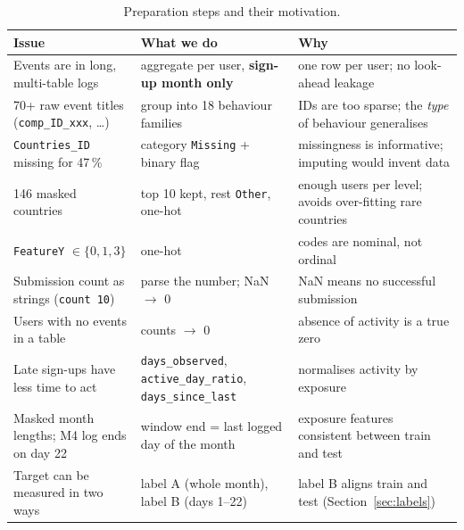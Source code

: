\documentclass[11pt,a4paper]{article}
\newcommand{\code}[1]{\texttt{#1}}
\begin{document}
\begin{table}[H]\centering\small
\begin{tabular}{>{\raggedright}p{4.3cm}>{\raggedright}p{5.2cm}>{\raggedright\arraybackslash}p{5.6cm}}\toprule
Issue & What we do & Why\\\midrule
Events are in long, multi-table logs & aggregate per user, \textbf{sign-up month only} & one row per user; no look-ahead leakage\\
70+ raw event titles (\code{comp\_ID\_xxx}, \dots) & group into 18 behaviour families & IDs are too sparse; the \emph{type} of behaviour generalises\\
\code{Countries\_ID} missing for 47\,\% & category \code{Missing} + binary flag & missingness is informative; imputing would invent data\\
146 masked countries & top 10 kept, rest \code{Other}, one-hot & enough users per level; avoids over-fitting rare countries\\
\code{FeatureY} $\in\{0,1,3\}$ & one-hot & codes are nominal, not ordinal\\
Submission count as strings (\code{\textquotedbl{}count 10\textquotedbl}) & parse the number; NaN $\to$ 0 & NaN means no successful submission\\
Users with no events in a table & counts $\to$ 0 & absence of activity is a true zero\\
Late sign-ups have less time to act & \code{days\_observed}, \code{active\_day\_ratio}, \code{days\_since\_last} & normalises activity by exposure\\
Masked month lengths; M4 log ends on day 22 & window end = last logged day of the month & exposure features consistent between train and test\\
Target can be measured in two ways & label A (whole month), label B (days 1--22) & label B aligns train and test (Section~\ref{sec:labels})\\\bottomrule
\end{tabular}
\caption{Preparation steps and their motivation.}\label{tab:prep}
\end{table}
\end{document}
